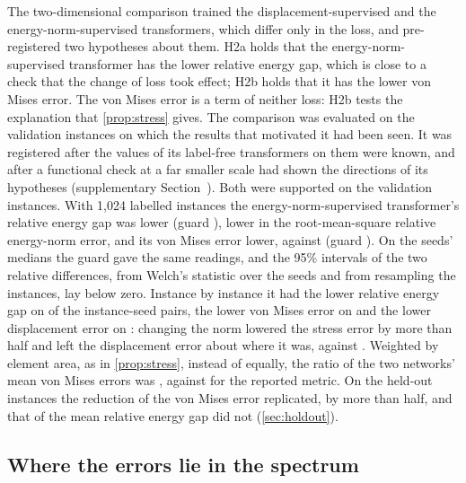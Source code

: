 

The two-dimensional comparison trained the displacement-supervised and the
energy-norm-supervised transformers, which differ only in the loss, and pre-registered two hypotheses about them. H2a holds that the energy-norm-supervised
transformer has the lower relative energy gap, which is close to a check that the change of
loss took effect; H2b holds that it has the lower von Mises error. The von Mises error is a term of neither loss: H2b
tests the explanation that \cref{prop:stress} gives. The comparison was evaluated on the
validation instances on which the results that motivated it had been seen. It was registered after the values of
its label-free transformers on them were known, and after a functional check at a far smaller scale had shown the directions of its hypotheses
(supplementary Section~\SuppPrereg{}). Both were supported on the validation instances. With
1,024 labelled instances the energy-norm-supervised transformer's relative energy gap was
\numHTwoARel{} lower (guard \numHTwoATau{}), \numHTwoARootRel{} lower in the
root-mean-square relative energy-norm error, and its von Mises error \numHTwoBRel{} lower,
\numCmKnormVm{} against \numCmLabVm{} (guard \numHTwoBTau{}). On the seeds' medians the
guard gave the same readings, and the 95\% intervals of the two relative differences, from
Welch's statistic over the seeds and from resampling the instances, lay below zero. Instance
by instance it had the lower relative energy gap on \numPairCmKnormLabGap{} of the
instance-seed pairs, the lower von Mises error on \numPairCmKnormLabVm{} and the lower
displacement error on \numPairCmKnormLabDisp{}: changing the norm lowered the stress error
by more than half and left the displacement error about where it was, \numCmKnormDisp{}
against \numCmLabDisp{}. Weighted by element area, as in \cref{prop:stress}, instead of
equally, the ratio of the two networks' mean von Mises errors was \numSpecVmAreaRatio{},
against \numSpecVmElemRatio{} for the reported metric. On the held-out instances the
reduction of the von Mises error replicated, by more than half, and that of the mean
relative energy gap did not (\cref{sec:holdout}).

\subsection{Where the errors lie in the spectrum}\label{sec:norm:spectrum}

